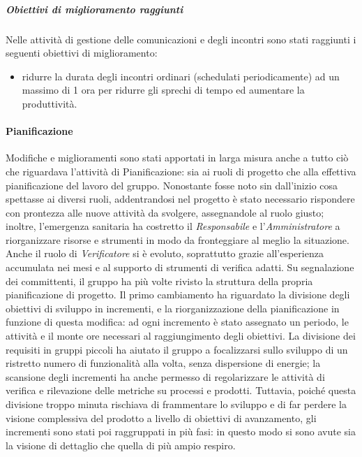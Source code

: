 				\subparagraph{Obiettivi di miglioramento raggiunti}
					Nelle attività di gestione delle comunicazioni e degli incontri sono stati raggiunti i seguenti obiettivi di miglioramento:
					\begin{itemize}
						\item ridurre la durata degli incontri ordinari (schedulati periodicamente) ad un massimo di 1 ora per ridurre gli sprechi di tempo ed aumentare la produttività.
					\end{itemize}
		
			\paragraph{Pianificazione}
				Modifiche e miglioramenti sono stati apportati in larga misura anche a tutto ciò che riguardava l'attività di Pianificazione: sia ai ruoli di progetto che alla effettiva pianificazione del lavoro del gruppo.
				\newline
				Nonostante fosse noto sin dall'inizio cosa spettasse ai diversi ruoli, addentrandosi nel progetto è stato necessario rispondere con prontezza alle nuove attività da svolgere, assegnandole al ruolo giusto; inoltre, l'emergenza sanitaria ha costretto il \textit{Responsabile} e l'\textit{Amministratore} a riorganizzare risorse e strumenti in modo da fronteggiare al meglio la situazione. Anche il ruolo di \textit{Verificatore} si è evoluto, soprattutto grazie all'esperienza accumulata nei mesi e al supporto di strumenti di verifica adatti.
				\newline
				Su segnalazione dei committenti, il gruppo ha più volte rivisto la struttura della propria pianificazione di progetto. Il primo cambiamento ha riguardato la divisione degli obiettivi di sviluppo in incrementi, e la riorganizzazione della pianificazione in funzione di questa modifica: ad ogni incremento è stato assegnato un periodo, le attività e il monte ore necessari al raggiungimento degli obiettivi. La divisione dei requisiti in gruppi piccoli ha aiutato il gruppo a focalizzarsi sullo sviluppo di un ristretto numero di funzionalità alla volta, senza dispersione di energie; la scansione degli incrementi ha anche permesso di regolarizzare le attività di verifica e rilevazione delle metriche su processi e prodotti. Tuttavia, poiché questa divisione troppo minuta rischiava di frammentare lo sviluppo e di far perdere la visione complessiva del prodotto a livello di obiettivi di avanzamento, gli incrementi sono stati poi raggruppati in più fasi: in questo modo si sono avute sia la visione di dettaglio che quella di più ampio respiro.
				

